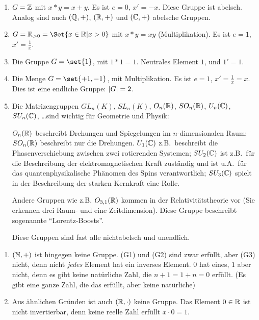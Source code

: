\begin{example}
    \begin{enumerate}
        \item $G = \mathbb{Z}$ mit $x*y = x+y$. Es ist $e=0$, $x'=-x$. Diese Gruppe ist abelsch. Analog sind auch $(\mathbb{Q},+)$, $(\mathbb{R},+)$ und $(\mathbb{C},+)$ abelsche Gruppen.
        \item $G = \IR_{>0} = \Set{x \in \IR | x > 0 }$ mit $x*y = xy$ (Multiplikation). Es ist $e=1$, $x' = \frac{1}{x}$.
        \item Die  Gruppe $G = \set{1}$, mit $1*1 = 1$. Neutrales Element $1$, und $1' = 1$.
        \item Die Menge $G = \set{+1,-1}$, mit Multiplikation. Es ist $e=1$, $x'=\frac{1}{x}=x$. Dies ist eine endliche Gruppe: $\lvert G\rvert = 2$.
        \item Die Matrizengruppen $GL_n(K)$, $SL_n(K)$, $O_n(\mathbb{R})$, $SO_n(\mathbb{R})$, $U_n(\mathbb{C})$, $SU_n(\mathbb{C})$, \ldots sind wichtig für Geometrie und Physik:

        $O_n(\mathbb{R})$ beschreibt Drehungen und Spiegelungen im $n$-dimensionalen Raum; $SO_n(\mathbb{R})$ beschreibt nur die Drehungen. $U_1(\mathbb{C})$ z.B.\ beschreibt die Phasenverschiebung zwischen zwei rotierenden Systemen; $SU_2(\mathbb{C})$ ist z.B.\ für die Beschreibung der elektromagnetischen Kraft zuständig und ist u.A.\ für das quantenphysikalische Phänomen des Spins verantwortlich; $SU_3(\mathbb{C})$ spielt in der Beschreibung der starken Kernkraft eine Rolle.

        Andere Gruppen wie z.B. $O_{3,1}(\mathbb{R})$ kommen in der Relativitätstheorie vor (Sie erkennen drei Raum- und eine Zeitdimension). Diese Gruppe beschreibt sogenannte \enquote{Lorentz-Boosts}.

        Diese Gruppen sind fast alle nichtabelsch und unendlich.
    \end{enumerate}
\end{example}

\begin{example}
    \begin{enumerate}
        \item $(\mathbb{N},+)$ ist hingegen keine Gruppe. (G1) und (G2) sind zwar erfüllt, aber (G3) nicht, denn nicht \emph{jedes} Element hat ein inverses Element. $0$ hat eines, $1$ aber nicht, denn es gibt keine natürliche Zahl, die $n+1=1+n=0$ erfüllt. (Es gibt eine ganze Zahl, die das erfüllt, aber keine natürliche)

        \item Aus ähnlichen Gründen ist auch $(\mathbb{R},\cdot)$ keine Gruppe. Das Element $0\in\mathbb{R}$ ist nicht invertierbar, denn keine reelle Zahl erfüllt $x\cdot 0 = 1$.
    \end{enumerate}
\end{example}


